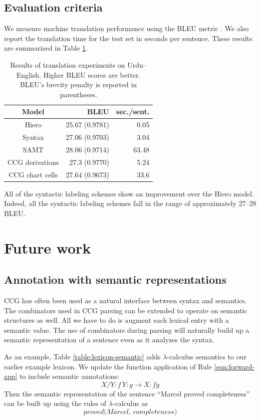 \documentclass{article}
\begin{document}
\subsection{Evaluation criteria}

We measure machine translation performance using the BLEU metric \cite{papineni-bleu}. We also report the translation time for the test set in seconds per sentence. These results are summarized in Table \ref{table:results}.

\begin{table}
\centering
\begin{tabular}{|c|r|r|}
\hline
Model & BLEU & sec./sent. \\
\hline
Hiero & 25.67 (0.9781) & 0.05 \\
Syntax & 27.06 (0.9703) & 3.04 \\
SAMT & 28.06 (0.9714) & 63.48 \\
CCG derivations & 27.3 (0.9770) & 5.24 \\
CCG chart cells & 27.64 (0.9673) & 33.6 \\
\hline
\end{tabular}
\caption{Results of translation experiments on Urdu--English. Higher BLEU scores are better. BLEU's brevity penalty is reported in parentheses.\label{table:results}}
\end{table}

All of the syntactic labeling schemes show an improvement over the Hiero model. Indeed, all the syntactic labeling schemes fall in the range of approximately 27--28 BLEU.

\section{Future work}

\subsection{Annotation with semantic representations}

CCG has often been used as a natural interface between syntax and semantics. The combinators used in CCG parsing can be extended to operate on semantic structures as well. All we have to do is augment each lexical entry with a semantic value. The use of combinators during parsing will naturally build up a semantic representation of a sentence even as it analyzes the syntax.

As an example, Table \ref{table:lexicon-semantic} adds $\lambda$-calculus semantics to our earlier example lexicon. We update the function application of Rule \ref{eqn:forward-app} to include semantic annotations:
\begin{equation}
X/Y:f \, Y:g \to X:fg
\end{equation}
Then the semantic representation of the sentence ``Marcel proved completeness'' can be built up using the rules of $\lambda$-calculus as
\begin{equation}
\textit{proved(Marcel, completeness)}
\end{equation}
\end{document}
